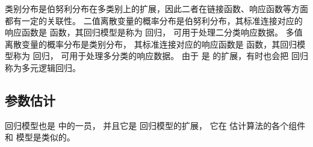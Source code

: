\documentclass[letterpaper,10pt,english]{sphinxmanual}
\begin{document}
类别分布是伯努利分布在多类别上的扩展，因此二者在链接函数、响应函数等方面都有一定的关联性。
二值离散变量的概率分布是伯努利分布，其标准连接对应的响应函数是  函数，其回归模型是称为  回归，
可用于处理二分类响应数据。
多值离散变量的概率分布是类别分布，
其标准连接对应的响应函数是  函数，其回归模型称为  回归，
可用于处理多分类的响应数据。
由于  是  的扩展，有时也会把  回归称为多元逻辑回归。


\subsection{参数估计}
\label{\detokenize{_u65e0_u5e8f_u79bb_u6563_u6a21_u578b/content:id4}}
 回归模型也是  中的一员，
并且它是  回归模型的扩展，
它在  估计算法的各个组件和  模型是类似的。
\end{document}
